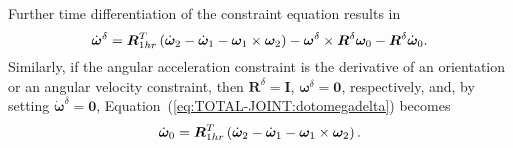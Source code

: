 \documentclass[10pt,fleqn,subeqn]{report}
\newcommand{\T}[1]{\bm{#1}}
\begin{document}
Further time differentiation of the constraint equation results in
\begin{equation}
	\dot{\T{\omega}}^{\delta}
	= \T{R}_{1hr}^T\plbr{
		\dot{\T{\omega}}_2
		- \dot{\T{\omega}}_1
		- \T{\omega}_1 \times \T{\omega}_2
	} - \T{\omega}^{\delta} \times \T{R}^{\delta} \T{\omega}_0
	- \T{R}^{\delta} \dot{\T{\omega}}_0 .
	\label{eq:TOTAL-JOINT:dotomegadelta}
\end{equation}
Similarly, if the angular acceleration constraint 
is the derivative of an orientation or an angular velocity constraint,
then $\T{R}^{\delta}=\T{I}$, $\T{\omega}^{\delta}=\T{0}$, respectively,
and, by setting $\dot{\T{\omega}}^{\delta}=\T{0}$,
Equation~(\ref{eq:TOTAL-JOINT:dotomegadelta}) becomes
\begin{equation}
	\dot{\T{\omega}}_0 = \T{R}_{1hr}^T\plbr{
		\dot{\T{\omega}}_2
		- \dot{\T{\omega}}_1
		- \T{\omega}_1 \times \T{\omega}_2
	} .
\end{equation}
\end{document}
